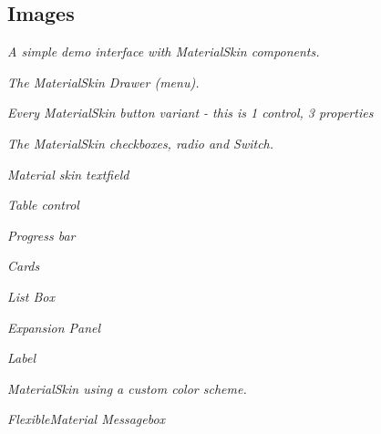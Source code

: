 \subsection*{Images}

{\itshape A simple demo interface with Material\+Skin components.} 

{\itshape The Material\+Skin Drawer (menu).} 

{\itshape Every Material\+Skin button variant -\/ this is 1 control, 3 properties} 

{\itshape The Material\+Skin checkboxes, radio and Switch.} 

{\itshape Material skin textfield} 

{\itshape Table control} 

{\itshape Progress bar} 

{\itshape Cards} 

{\itshape List Box} 

{\itshape Expansion Panel} 

{\itshape Label} 

{\itshape Material\+Skin using a custom color scheme.} 

{\itshape Flexible\+Material Messagebox}  